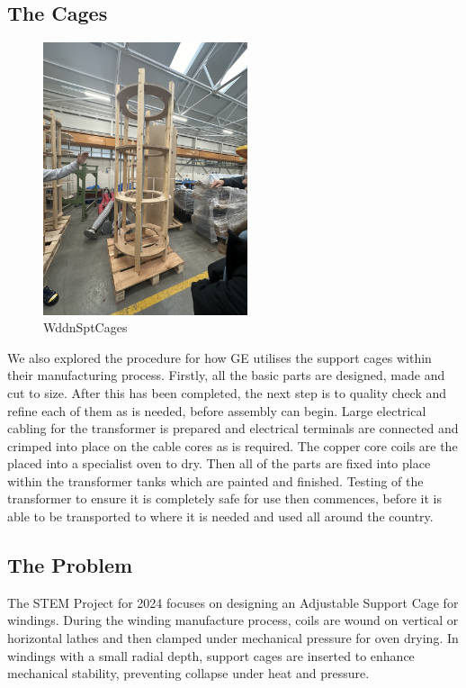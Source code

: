 \documentclass[a4paper,10pt]{article}
\begin{document}
\subsection{The Cages}
\begin{figure}[H]
  \centering
  \includegraphics[width=6cm, angle=270]{wooden-support-cage}
  \caption{\gls{WddnSptCages}}
  \label{fig:wooden-support-cage}
\end{figure}

We also explored the procedure for how \gls{GE} utilises the support cages within their manufacturing process. Firstly, all the basic parts are designed, made and cut to size. After this has been completed, the next step is to quality check and refine each of them as is needed, before assembly can begin. Large electrical cabling for the transformer is prepared and electrical terminals are connected and crimped into place on the cable cores as is required. The copper core coils are the placed into a specialist oven to dry. Then all of the parts are fixed into place within the transformer tanks which are painted and finished. Testing of the transformer to ensure it is completely safe for use then commences, before it is able to be transported to where it is needed and used all around the country.

\subsection{The Problem}
The STEM Project for 2024 focuses on designing an Adjustable Support Cage for windings. During the winding manufacture process, coils are wound on vertical or horizontal lathes and then clamped under mechanical pressure for oven drying. In windings with a small radial depth, support cages are inserted to enhance mechanical stability, preventing collapse under heat and pressure.
\end{document}
